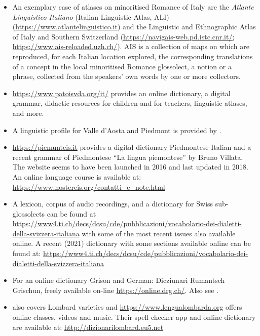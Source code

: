\documentclass[a4paper,11pt]{article}
\begin{document}
\begin{itemize}
\item An exemplary case of atlases on minoritised Romance of Italy are the \textit{Atlante Linguistico Italiano} (Italian Linguistic Atlas, ALI) (\url{https://www.atlantelinguistico.it}) and the Linguistic and Ethnographic Atlas of Italy and Southern Switzerland (\url{https://navigais-web.pd.istc.cnr.it/; https://www.ais-reloaded.uzh.ch/}). AIS is a collection of maps on which are reproduced, for each Italian location explored, the corresponding translations of a concept in the local minoritised Romance glossolect, a notion or a phrase, collected from the speakers' own words by one or more collectors.

\item \url{https://www.patoisvda.org/it/} provides an online dictionary, a digital grammar, didactic resources for children and for teachers, linguistic atlases, and more. 

\item A linguistic profile for Valle d'Aosta and Piedmont is provided by \citet{regis2023dialetti}.

\item \url{https://piemunteis.it} provides a digital dictionary Piedmontese-Italian and a recent grammar of Piedmontese ``La lingua piemontese'' by Bruno Villata. The website seems to have been launched in 2016 and last updated in 2018. An online language course is available at: \url{https://www.nostereis.org/contatti_e_note.html}


\item A lexicon, corpus of audio recordings, and a dictionary for Swiss sub-glossolects can be found at \url{https://www4.ti.ch/decs/dcsu/cde/pubblicazioni/vocabolario-dei-dialetti-della-svizzera-italiana} with some of the most recent issues also available online. A recent (2021) dictionary with some sections available online can be found at: \url{https://www4.ti.ch/decs/dcsu/cde/pubblicazioni/vocabolario-dei-dialetti-della-svizzera-italiana}

\item For an online dictionary Grison and German:  Dicziunari Rumantsch Grischun, freely available on-line \url{https://online.drg.ch/}. Also see \citet{guerini2023dialetti, bianconi1980lingua}. 

\item \citet{guerini2023dialetti} also covers Lombard varieties and \url{https://www.lengualombarda.org} offers online classes, videos and music. Their spell checker app and online dictionary are available at:  \url{http://dizionarilombard.eu5.net}
    

\end{itemize}
\end{document}
